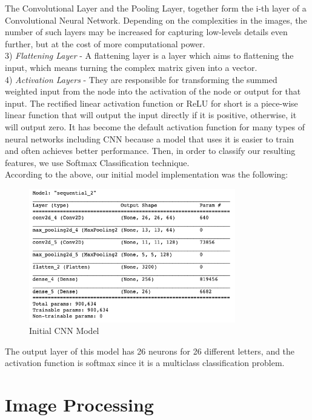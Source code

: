 \documentclass[conference]{IEEEtran}
\begin{document}
The Convolutional Layer and the Pooling Layer, together form the i-th layer of a Convolutional Neural Network. Depending on the complexities in the images, the number of such layers may be increased for capturing low-levels details even further, but at the cost of more computational power.\cite{towardsdatascience_Saha} \\

3) \textit{Flattening Layer} - A flattening layer is a layer which aims to flattening the input, which means turning the complex matrix given into a vector. \\

4) \textit{Activation Layers} - They are responsible for transforming the summed weighted input from the node into the activation of the node or output for that input.
The rectified linear activation function or ReLU for short is a piece-wise linear function that will output the input directly if it is positive, otherwise, it will output zero. It has become the default activation function for many types of neural networks including CNN because a model that uses it is easier to train and often achieves better performance. Then, in order to classify our resulting features, we use Softmax Classification technique.\cite{towardsdatascience_Saha} \\

According to the above, our initial model implementation was the following:
\begin{figure}[htbp]
    \centerline{\includegraphics[width=9cm]{img/initial_model.png}}
    \caption{Initial CNN Model}
    \label{fig:hist_train_classes}
\end{figure}

The output layer of this model has 26 neurons for 26 different letters, and the activation function is softmax since it is a multiclass classification problem.

\section{Image Processing}
\end{document}
